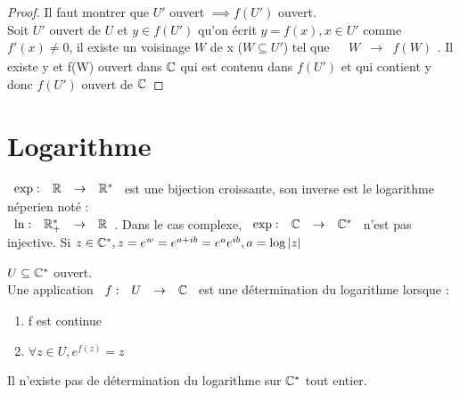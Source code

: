 \documentclass[]{report}
\begin{document}
\begin{proof}{}{}
    Il faut montrer que $U'$ ouvert $\implies f(U')$ ouvert.\\
    Soit $U'$ ouvert de $U$ et $y\in f(U')$ qu'on écrit $y=f(x),x\in U'$ comme $f'(x)\neq0$, il existe un voisinage $W$ de x ($W \subseteq U'$) tel que $\begin{array}{ccccc}
& W & \to & f(W)
\end{array}$. Il existe y et f(W) ouvert dans $\mathbb{C}$ qui est contenu dans $f(U')$ et qui contient y donc $f(U')$ ouvert de $\mathbb{C}$
\end{proof}

\section{Logarithme}

$\begin{array}{ccccc}
\exp : & \mathbb{R} & \to & \mathbb{R}^*
\end{array}$ est une bijection croissante, son inverse est le logarithme néperien noté :\\
$\begin{array}{ccccc}
\ln : & \mathbb{R}^*_+ & \to & \mathbb{R}
\end{array}$. Dans le cas complexe, $\begin{array}{ccccc}
\exp : & \mathbb{C} & \to & \mathbb{C}^*
\end{array}$ n'est pas injective. Si $z\in \mathbb{C}^*,z=e^w=e^{a+ib}=e^ae^{ib},a=\log |z|$

\begin{df}{}{}
    $U\subseteq\mathbb{C}^*$ ouvert.\\
    Une application $\begin{array}{ccccc}
f : & U & \to & \mathbb{C}
\end{array}$ est une détermination du logarithme lorsque :
\begin{enumerate}
    \item f est continue
    \item $\forall z\in U,e^{f(z)}=z$
\end{enumerate}
\end{df}

\begin{prop}{}{}
    Il n'existe pas de détermination du logarithme sur $\mathbb{C}^*$ tout entier.
\end{prop}
\end{document}
